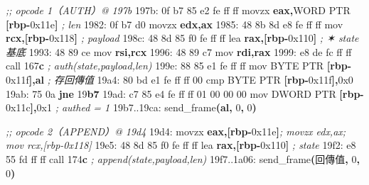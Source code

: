 \documentclass[10pt,a4paper]{article}
\newenvironment{Shaded}{\begin{snugshade}}{\end{snugshade}}
\newcommand{\BaseNTok}[1]{\textcolor[rgb]{0.00,0.00,0.81}{#1}}
\newcommand{\BuiltInTok}[1]{#1}
\newcommand{\CommentTok}[1]{\textcolor[rgb]{0.56,0.35,0.01}{\textit{#1}}}
\newcommand{\ControlFlowTok}[1]{\textcolor[rgb]{0.13,0.29,0.53}{\textbf{#1}}}
\newcommand{\DataTypeTok}[1]{\textcolor[rgb]{0.13,0.29,0.53}{#1}}
\newcommand{\DecValTok}[1]{\textcolor[rgb]{0.00,0.00,0.81}{#1}}
\newcommand{\ErrorTok}[1]{\textcolor[rgb]{0.64,0.00,0.00}{\textbf{#1}}}
\newcommand{\KeywordTok}[1]{\textcolor[rgb]{0.13,0.29,0.53}{\textbf{#1}}}
\newcommand{\NormalTok}[1]{#1}
\newcommand{\OperatorTok}[1]{\textcolor[rgb]{0.81,0.36,0.00}{\textbf{#1}}}
\renewenvironment{Shaded}{%
  \def\FrameCommand{\fboxsep=3.2pt\colorbox{shadecolor}}%
  \MakeFramed{\advance\hsize-\width\FrameRestore\small}%
}{%
  \endMakeFramed
}
\begin{document}
\begin{Shaded}
\begin{Highlighting}[]
\CommentTok{;; opcode 1（AUTH）@ 197b}
\NormalTok{197b: 0f b7 }\DecValTok{85}\NormalTok{ e2 fe ff ff   movzx  }\KeywordTok{eax}\OperatorTok{,}\DataTypeTok{WORD} \DataTypeTok{PTR} \OperatorTok{[}\KeywordTok{rbp}\OperatorTok{{-}}\BaseNTok{0x11e}\OperatorTok{]} \CommentTok{; len}
\NormalTok{1982: 0f b7 d0               movzx  }\KeywordTok{edx}\OperatorTok{,}\KeywordTok{ax}
\NormalTok{1985: 48 8b 8d e8 fe ff ff   mov    }\KeywordTok{rcx}\OperatorTok{,[}\KeywordTok{rbp}\OperatorTok{{-}}\BaseNTok{0x118}\OperatorTok{]}           \CommentTok{; payload}
\NormalTok{198c: 48 8d 85 f0 fe ff ff   lea    }\KeywordTok{rax}\OperatorTok{,[}\KeywordTok{rbp}\OperatorTok{{-}}\BaseNTok{0x110}\OperatorTok{]}           \CommentTok{; ✶ state 基底}
\NormalTok{1993: 48 89 ce               mov    }\KeywordTok{rsi}\OperatorTok{,}\KeywordTok{rcx}
\NormalTok{1996: 48 89 c7               mov    }\KeywordTok{rdi}\OperatorTok{,}\KeywordTok{rax}
\NormalTok{1999: e8 de fc ff ff         call   }\DecValTok{167}\ErrorTok{c}                      \CommentTok{; auth(state,payload,len)}
\NormalTok{199e: 88 85 e1 fe ff ff      mov    }\DataTypeTok{BYTE} \DataTypeTok{PTR} \OperatorTok{[}\KeywordTok{rbp}\OperatorTok{{-}}\BaseNTok{0x11f}\OperatorTok{],}\KeywordTok{al}   \CommentTok{; 存回傳值}
\NormalTok{19a4: 80 bd e1 fe ff ff }\DecValTok{00}\NormalTok{   cmp    }\DataTypeTok{BYTE} \DataTypeTok{PTR} \OperatorTok{[}\KeywordTok{rbp}\OperatorTok{{-}}\BaseNTok{0x11f}\OperatorTok{],}\BaseNTok{0x0}
\NormalTok{19ab: 75 0a                  }\ControlFlowTok{jne}    \DecValTok{19}\ErrorTok{b7}
\NormalTok{19ad: c7 }\DecValTok{85}\NormalTok{ e4 fe ff ff }\DecValTok{01} \DecValTok{00} \DecValTok{00} \DecValTok{00}\NormalTok{  mov }\DataTypeTok{DWORD} \DataTypeTok{PTR} \OperatorTok{[}\KeywordTok{rbp}\OperatorTok{{-}}\BaseNTok{0x11c}\OperatorTok{],}\BaseNTok{0x1}   \CommentTok{; authed = 1}
\NormalTok{19b7..19ca: send\_frame}\OperatorTok{(}\KeywordTok{al}\OperatorTok{,} \DecValTok{0}\OperatorTok{,} \DecValTok{0}\OperatorTok{)}

\CommentTok{;; opcode 2（APPEND）@ 19d4}
\NormalTok{19d4: }\BuiltInTok{movzx} \KeywordTok{eax}\OperatorTok{,[}\KeywordTok{rbp}\OperatorTok{{-}}\BaseNTok{0x11e}\OperatorTok{]}\CommentTok{; movzx edx,ax; mov rcx,[rbp{-}0x118]}
\NormalTok{19e5: 48 8d 85 f0 fe ff ff   lea    }\KeywordTok{rax}\OperatorTok{,[}\KeywordTok{rbp}\OperatorTok{{-}}\BaseNTok{0x110}\OperatorTok{]}           \CommentTok{; state}
\NormalTok{19f2: e8 }\DecValTok{55}\NormalTok{ fd ff ff         call   }\DecValTok{174}\ErrorTok{c}                      \CommentTok{; append(state,payload,len)}
\NormalTok{19f7..1a06: send\_frame}\OperatorTok{(}\NormalTok{回傳值}\OperatorTok{,} \DecValTok{0}\OperatorTok{,} \DecValTok{0}\OperatorTok{)}


\end{Highlighting}
\end{Shaded}
\end{document}
